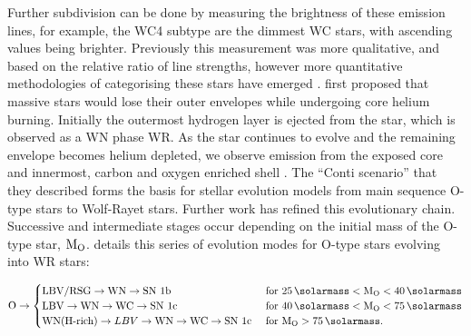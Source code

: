 \noindent
Further subdivision can be done by measuring the brightness of these emission lines, for example, the WC4 subtype are the dimmest WC stars, with ascending values being brighter.
Previously this measurement was more qualitative, and based on the relative ratio of line strengths, however more quantitative methodologies of categorising these stars have emerged
\parencite{crowtherQuantitativeClassificationWC1998}.
\textcite{contiRelationshipWRStars1975} first proposed that massive stars would lose their outer envelopes while undergoing core helium burning.
Initially the outermost hydrogen layer is ejected from the star, which is observed as a WN phase WR.
As the star continues to evolve and the remaining envelope becomes helium depleted, we observe emission from the exposed core and innermost, carbon and oxygen enriched shell
\parencite{neugentWolfRayetContent2019,oswaltPlanetsStarsStellar2013}.
The ``Conti scenario'' that they described forms the basis for stellar evolution models from main sequence O-type stars to Wolf-Rayet stars.
Further work has refined this evolutionary chain.
Successive and intermediate stages occur depending on the initial mass of the O-type star, $\text{M}_\text{O}$.
\textcite{crowther_physical_2007} details this series of evolution modes for O-type stars evolving into WR stars:

\begin{equation}
  \label{eq:wrevolution}
  \text{O} \rightarrow
  \begin{cases}
    \text{LBV/RSG} \rightarrow \text{WN} \rightarrow \text{SN 1b} & \text{ for } \SI{25}{\solarmass} < \mass\rms{O} < \SI{40}{\solarmass} \\
    \text{LBV} \rightarrow \text{WN} \rightarrow \text{WC} \rightarrow \text{SN 1c} & \text{ for } \SI{40}{\solarmass} < \mass\rms{O} < \SI{75}{\solarmass} \\ 
    \text{WN(H-rich)} \rightarrow LBV \rightarrow \text{WN} \rightarrow \text{WC} \rightarrow \text{SN 1c} & \text{ for } \mass\rms{O} > \SI{75}{\solarmass} .
  \end{cases}
\end{equation}

